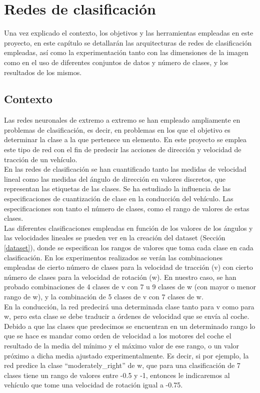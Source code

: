 \chapter{Redes de clasificación}\label{cap.clasificacion}

Una vez explicado el contexto, los objetivos y las herramientas empleadas en este proyecto, en este capítulo se detallarán las arquitecturas de redes de clasificación empleadas, así como la experimentación tanto con las dimensiones de la imagen como en el uso de diferentes conjuntos de datos y número de clases, y los resultados de los mismos.


\section{Contexto}

Las redes neuronales de extremo a extremo se han empleado ampliamente en problemas de clasificación, es decir, en problemas en los que el objetivo es determinar la clase a la que pertenece un elemento. En este proyecto se emplea este tipo de red con el fin de predecir las acciones de dirección y velocidad de tracción de un vehículo.\\

En las redes de clasificación se han cuantificado tanto las medidas de velocidad lineal como las medidas del ángulo de dirección en valores discretos, que representan las etiquetas de las clases. Se ha estudiado la influencia de las especificaciones de cuantización de clase en la conducción del vehículo. Las especificaciones son tanto el número de clases, como el rango de valores de estas clases.\\

Las diferentes clasificaciones empleadas en función de los valores de los ángulos y las velocidades lineales se pueden ver en la creación del dataset (Sección \ref{dataset}), donde se especifican los rangos de valores que toma cada clase en cada clasificación. En los experimentos realizados se verán las combinaciones empleadas de cierto número de clases para la velocidad de tracción (v) con cierto número de clases para la velocidad de rotación (w). En nuestro caso, se han probado combinaciones de 4 clases de v con 7 u 9 clases de w (con mayor o menor rango de w), y la combinación de 5 clases de v con 7 clases de w.\\

En la conducción, la red predecirá una determinada clase tanto para v como para w, pero esta clase se debe traducir a órdenes de velocidad que se envía al coche. Debido a que las clases que predecimos se encuentran en un determinado rango lo que se hace es mandar como orden de velocidad a los motores del coche el resultado de la media del mínimo y el máximo valor de ese rango, o un valor próximo a dicha media ajustado experimentalmente. Es decir, si por ejemplo, la red predice la clase ``moderately\_right'' de w, que para una clasificación de 7 clases tiene un rango de valores entre -0.5 y -1, entonces le indicaremos al vehículo que tome una velocidad de rotación igual a -0.75.\\


